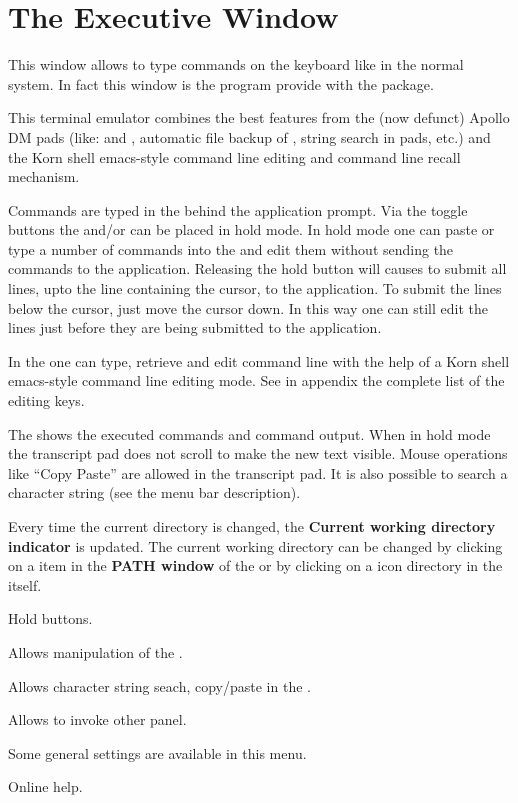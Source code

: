 \clearpage

\section{The Executive Window}


This window allows to type commands on the keyboard like in the normal \XPAW{}
system. In fact this window is the  program provide with the \KUIP{}
package.

This terminal emulator combines the best features from the (now defunct) Apollo
DM pads (like: \IP{} and \TP, automatic file backup of \TP, string search in 
pads, etc.) and the Korn shell emacs-style command line editing and command line
recall mechanism.

Commands are typed in the \IP{}  behind the application prompt. Via the
toggle buttons   the \IP{} and/or \TP{} can be placed in hold
mode. In hold mode one can paste or type a number of commands into the \IP{} and
edit them without sending the commands to the application. Releasing the hold 
button will causes  to submit all lines, upto the line containing 
the cursor, to the application. To submit the lines below the cursor, just move
the cursor down. In this way one can still edit the lines just before they are
being submitted to the application.


\begin{EnumZB}
\item In the \IP{} one can type, retrieve and edit command line with the help of
      a Korn shell emacs-style command line editing mode. See in appendix the 
      complete list of the editing keys.
\item The \TP{}  shows the executed commands and command output.
      When in hold mode  the transcript pad does not scroll to make 
      the new text
      visible. Mouse operations like ``Copy Paste'' are allowed in the 
      transcript pad. It is also possible to search a character string (see the
      menu bar description).
\item Every time the current directory is changed, the {\bf Current working 
      directory indicator} is updated. The current working directory can be 
      changed by clicking on a item in the {\bf PATH window} of the \MB{} or
      by clicking on a icon directory in the \MB{} itself.
\item Hold buttons.
\end{EnumZB}
\begin{EnumZW}
\item Allows manipulation of the \TP. 
\item Allows character string seach, copy/paste in the \TP.
\item Allows to invoke other panel. 
\item Some general settings are available in this menu. 
\item Online help.
\end{EnumZW}


